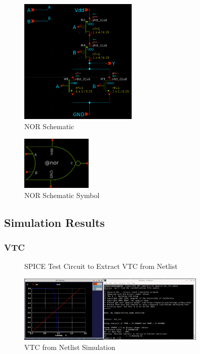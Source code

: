 \documentclass{article}
\begin{document}
	\begin{figure}[H]
		\centerline{\includegraphics[width=0.5\textwidth]{nor_schematic.png}}
		\caption{NOR Schematic}
		\label{fig::nor_sechematic}
	\end{figure}
	
	\begin{figure}[H]
		\centerline{\includegraphics[width=0.3\textwidth]{nor_symbol.png}}
		\caption{NOR Schematic Symbol}
		\label{fig::nor_symbol}
	\end{figure}
	
	\subsection{Simulation Results}
	
	\subsubsection{VTC}
	
	\begin{figure}[H]
		
		\caption{SPICE Test Circuit to Extract VTC from Netlist}
		\label{fig::nor_vtc_test_circuit}
	\end{figure}
	
	\begin{figure}[H]
		\centerline{\includegraphics[width=0.8\textwidth]{nor_vtc.png}}
		\caption{VTC from Netlist Simulation}
		\label{fig::nor_vtc}
	\end{figure}
	
\end{document}
